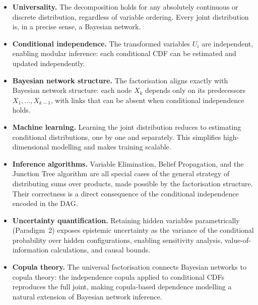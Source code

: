 \begin{itemize}
\item \textbf{Universality.} The decomposition holds for any absolutely
      continuous or discrete distribution, regardless of variable ordering.
      Every joint distribution is, in a precise sense, a Bayesian network.

\item \textbf{Conditional independence.} The transformed variables $U_i$ are
      independent, enabling modular inference: each conditional CDF can be
      estimated and updated independently.

\item \textbf{Bayesian network structure.} The factorisation aligns exactly
      with Bayesian network structure: each node $X_k$ depends only on its
      predecessors $X_1,\ldots,X_{k-1}$, with links that can be absent when
      conditional independence holds.

\item \textbf{Machine learning.} Learning the joint distribution reduces to
      estimating conditional distributions, one by one and separately. This
      simplifies high-dimensional modelling and makes training scalable.

\item \textbf{Inference algorithms.} Variable Elimination, Belief
      Propagation, and the Junction Tree algorithm are all special cases of
      the general strategy of distributing sums over products, made possible
      by the factorisation structure. Their correctness is a direct
      consequence of the conditional independence encoded in the DAG.

\item \textbf{Uncertainty quantification.} Retaining hidden variables
      parametrically (Paradigm~2) exposes epistemic uncertainty as the
      variance of the conditional probability over hidden configurations,
      enabling sensitivity analysis, value-of-information calculations, and
      causal bounds.

\item \textbf{Copula theory.} The universal factorisation connects Bayesian
      networks to copula theory: the independence copula applied to
      conditional CDFs reproduces the full joint, making copula-based
      dependence modelling a natural extension of Bayesian network inference.
\end{itemize}

